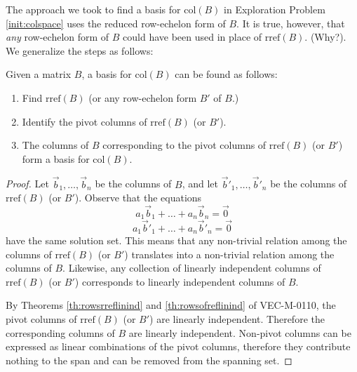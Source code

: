 \documentclass{ximera}
\begin{document}
The approach we took to find a basis for $\mbox{col}(B)$ in Exploration Problem \ref{init:colspace} uses the reduced row-echelon form of $B$. It is true, however, that {\it any} row-echelon form of $B$ could have been used in place of $\mbox{rref}(B)$.  (Why?). We generalize the steps as follows:
\begin{procedure}\label{proc:colspace}
Given a matrix $B$, a basis for $\mbox{col}(B)$ can be found as follows:
\begin{enumerate}
\item Find $\mbox{rref}(B)$ (or any row-echelon form $B'$ of $B$.)
\item Identify the pivot columns of $\mbox{rref}(B)$ (or $B'$).
\item The columns of $B$ corresponding to the pivot columns of $\mbox{rref}(B)$ (or $B'$) form a basis for $\mbox{col}(B)$.
\end{enumerate}
\begin{proof}  Let $\vec{b}_1,\ldots ,\vec{b}_n$ be the columns of $B$, and let $\vec{b}'_1,\ldots ,\vec{b}'_n$ be the columns of $\mbox{rref}(B)$ (or $B'$).
Observe that the equations
\begin{equation}a_1\vec{b}_1+\ldots +a_n\vec{b}_n=\vec{0}\end{equation}
\begin{equation}a_1\vec{b}'_1+\ldots +a_n\vec{b}'_n=\vec{0}\end{equation}
have the same solution set.  This means that any non-trivial relation among the columns of $\mbox{rref}(B)$ (or $B'$) translates into a non-trivial relation among the columns of $B$.  Likewise, any collection of linearly independent columns of $\mbox{rref}(B)$ (or $B'$) corresponds to linearly independent columns of $B$.

By Theorems \ref{th:rowsrreflinind} and \ref{th:rowsofreflinind} of VEC-M-0110, the pivot columns of $\mbox{rref}(B)$ (or $B'$) are linearly independent.  Therefore the corresponding columns of $B$ are linearly independent.  Non-pivot columns can be expressed as linear combinations of the pivot columns, therefore they contribute nothing to the span and can be removed from the spanning set. 
\end{proof}
\end{procedure}
\end{document}
